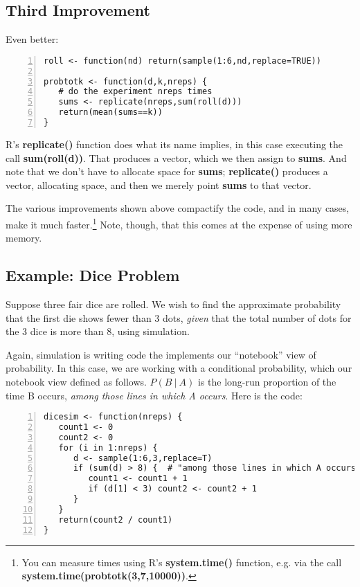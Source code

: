 \subsection{Third Improvement}
\label{thirdbetter}

Even better:

\begin{Verbatim}[fontsize=\relsize{-2},numbers=left]
roll <- function(nd) return(sample(1:6,nd,replace=TRUE))

probtotk <- function(d,k,nreps) {
   # do the experiment nreps times
   sums <- replicate(nreps,sum(roll(d)))
   return(mean(sums==k))
}
\end{Verbatim}

R's {\bf replicate()} function does what its name implies, in this case
executing the call {\bf sum(roll(d))}.  That produces a vector, which we
then assign to {\bf sums}.  And note that we don't have to allocate space
for {\bf sums}; {\bf replicate()} produces a vector, allocating space,
and then we merely point {\bf sums} to that vector.

The various improvements shown above compactify the code, and in many
cases, make it much faster.\footnote{You can measure times using R's
{\bf system.time()} function, e.g. via the call {\bf
system.time(probtotk(3,7,10000))}.}  Note, though, that this comes at
the expense of using more memory.

\subsection{Example: Dice Problem}

Suppose three fair dice are rolled.  We wish to find the approximate
probability that the first die shows fewer than 3 dots, {\it given} that the
total number of dots for the 3 dice is more than 8, using simulation.

Again, simulation is writing code the implements our ``notebook'' view of
probability.  In this case, we are working with a conditional
probability, which our notebook view defined as follows.  $P(B ~|~ A)$
is the long-run proportion of the time B occurs, {\it among those lines
in which A occurs}.  Here is the code:

\begin{lstlisting}[numbers=left]
dicesim <- function(nreps) {
   count1 <- 0
   count2 <- 0
   for (i in 1:nreps) {
      d <- sample(1:6,3,replace=T)
      if (sum(d) > 8) {  # "among those lines in which A occurs"
         count1 <- count1 + 1
         if (d[1] < 3) count2 <- count2 + 1
      }
   }
   return(count2 / count1)
}
\end{lstlisting}

